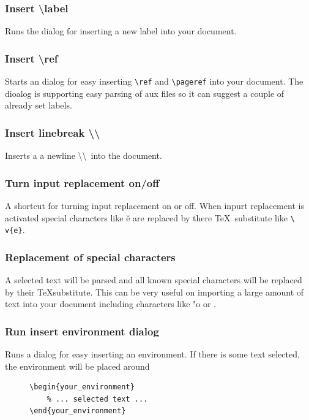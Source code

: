 \documentclass[/%
a4paper,%
10pt,%
oneside,%
DIV18,
headsepline,         %
plainheadsepline,
footsepline,         %
plainfootsepline,
bibtotoc,%
liststotoc,%
BCOR12mm,%
halfparskip,%
openany,%
]{scrartcl}
\begin{document}
\subsubsection*{Insert \textbackslash label}
Runs the dialog for inserting a new label into your document.

\subsubsection*{Insert \textbackslash ref}
Starts an dialog for easy inserting \texttt{\textbackslash ref} and
\texttt{\textbackslash pageref} into your document. The dioalog is
supporting easy parsing of aux files so it can suggest a couple of
already set labels.

\subsubsection*{Insert linebreak \textbackslash \textbackslash}
Inserts a a newline \textbackslash\textbackslash\ into the document.

\subsubsection*{Turn input replacement on/off}
A shortcut for turning input replacement on or off. When inpurt
replacement is activated special characters like \v{e} are
replaced by there \TeX\ substitute like \texttt{\textbackslash
v\{e\}}.

\subsubsection*{Replacement of special characters}
A selected text will be parsed and all known special characters will be
replaced by their \TeX substitute. This can be very useful on
importing a large amount of text into your document including
characters like "o or \frqq.

\subsubsection*{Run insert environment dialog}
Runs a dialog for easy inserting an environment. If there is some text
selected, the environment will be placed around
\begin{figure}[h!]
\begin{lstlisting}
\begin{your_environment}
	% ... selected text ...
\end{your_environment}
\end{lstlisting}
\end{figure}
\end{document}
